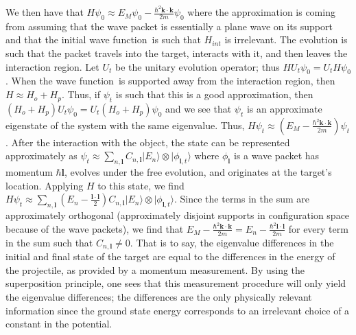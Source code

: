 \documentclass[11pt]{article}
\theoremstyle{remark}
\begin{document}
We then have that $H
\psi_0 \approx E_M \psi_0
 -\frac{\ensuremath{\hbar}^2 \ensuremath{\boldsymbol{k}} \cdot \ensuremath{\boldsymbol{k}}}{2m} \psi_0$ where the approximation is coming from
 assuming that the wave packet is essentially a plane wave on its
 support and that the initial wave function\ is such that $H_{int}$ is
 irrelevant.  
The evolution is such that the
 packet travels into the target, interacts with it, and then leaves the
 interaction region. 
 Let $U_t$ be the unitary evolution operator; thus  $H U_t \psi_0 = U_t
 H \psi_0$. When the wave function\ is supported away from the interaction
 region, then $H \approx H_o + H_p$. Thus, if $\ensuremath{\psi}_t$ is such that
 this is a good approximation, then $(H_o +H_p) U_t \psi_0 = U_t
 (H_o +H_p) \psi_0$ and we see that 
 $\psi_t$ is  an approximate
 eigenstate of the system with the same eigenvalue. Thus, $H \psi_t \approx
 (E_M -\frac{\ensuremath{\hbar}^2 \ensuremath{\boldsymbol{k}} \cdot \ensuremath{\boldsymbol{k}}}{2m} )\psi_t$. After the
 interaction with the object, the state can be represented
 approximately as $\psi_t \approx \sum_{n, \ensuremath{\boldsymbol{l}}} C_{n, \ensuremath{\boldsymbol{l}}} 
\lvert E_n \rangle \otimes
 \lvert \phi_{\ensuremath{\boldsymbol{l}}, t} \rangle$ where $\phi_{\ensuremath{\boldsymbol{l}}}$ is a wave
 packet  has
 momentum $\ensuremath{\hbar} \ensuremath{\boldsymbol{l}}$, evolves under the free evolution, and
 originates at the target's location.
 Applying $H$ to this state, we find $H \psi_t
 \approx \sum_{n, \ensuremath{\boldsymbol{l}}} (E_n - \frac{\ensuremath{\boldsymbol{l}} \cdot \ensuremath{\boldsymbol{l}}}{2}) C_{n, \ensuremath{\boldsymbol{l}}} \lvert E_n \rangle \otimes
 \lvert \phi_{\ensuremath{\boldsymbol{l}}, t} \rangle$. Since the terms in the sum are
 approximately orthogonal (approximately 
disjoint supports in configuration space
 because of the wave packets), we find that $E_M -\frac{\ensuremath{\hbar}^2\ensuremath{\boldsymbol{k}} \cdot \ensuremath{\boldsymbol{k}}}{2m} = E_n - \frac{\ensuremath{\hbar}^2\ensuremath{\boldsymbol{l}} \cdot \ensuremath{\boldsymbol{l}}}{2m}$ for every term in the sum such that $C_{n, \ensuremath{\boldsymbol{l}}} \neq 0$. That is to say, the eigenvalue differences in the initial
 and final state of the target are equal to the
 differences in the energy of the projectile, 
as provided by a momentum measurement.
  By using the
 superposition principle, one sees that this measurement procedure
 will only yield the eigenvalue differences; the differences are the only
 physically relevant information since the ground state energy
 corresponds to an irrelevant choice of a constant in the potential. 
\end{document}
